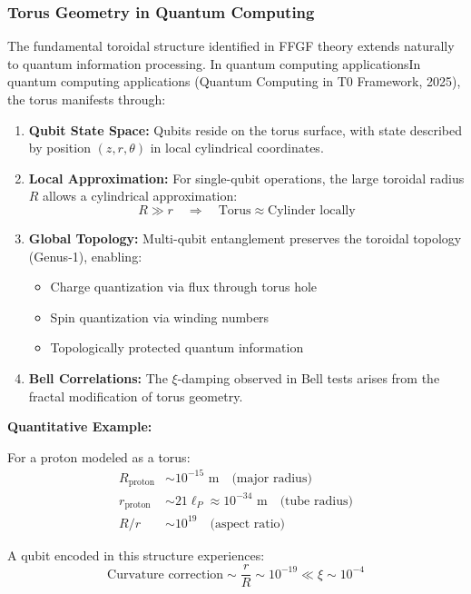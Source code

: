 \documentclass[12pt,a4paper]{article}
\begin{document}
\subsubsection{Torus Geometry in Quantum Computing}

The fundamental toroidal structure identified in FFGF theory extends 
naturally to quantum information processing. In quantum computing 
applicationsIn quantum computing applications (Quantum Computing in T0 Framework, 2025), the torus manifests through:

\begin{enumerate}
	\item \textbf{Qubit State Space:} Qubits reside on the torus surface, 
	with state described by position $(z, r, \theta)$ in local 
	cylindrical coordinates.
	
	\item \textbf{Local Approximation:} For single-qubit operations, the 
	large toroidal radius $R$ allows a cylindrical approximation:
	\[
	R \gg r \quad \Rightarrow \quad 
	\text{Torus} \approx \text{Cylinder locally}
	\]
	
	\item \textbf{Global Topology:} Multi-qubit entanglement preserves the 
	toroidal topology (Genus-1), enabling:
	\begin{itemize}
		\item Charge quantization via flux through torus hole
		\item Spin quantization via winding numbers
		\item Topologically protected quantum information
	\end{itemize}
	
	\item \textbf{Bell Correlations:} The $\xi$-damping observed in Bell 
	tests arises from the fractal modification of torus geometry.
\end{enumerate}

\textbf{Quantitative Example:}

For a proton modeled as a torus:
\begin{align}
	R_{\text{proton}} &\sim 10^{-15} \text{ m} \quad \text{(major radius)} \\
	r_{\text{proton}} &\sim 21\ell_P \approx 10^{-34} \text{ m} \quad 
	\text{(tube radius)} \\
	R/r &\sim 10^{19} \quad \text{(aspect ratio)}
\end{align}

A qubit encoded in this structure experiences:
\[
\text{Curvature correction} \sim \frac{r}{R} \sim 10^{-19} 
\ll \xi \sim 10^{-4}
\]
\end{document}
